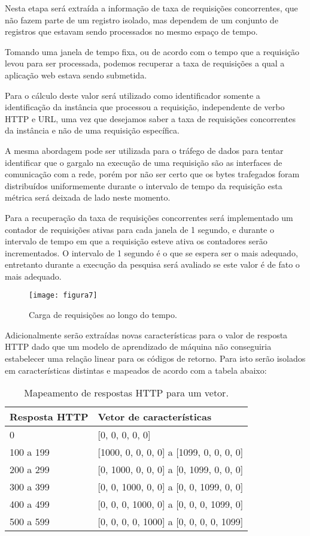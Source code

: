Nesta etapa será extraída a informação de taxa de requisições concorrentes,
que não fazem parte de um registro isolado, mas dependem de um conjunto de
registros que estavam sendo processados no mesmo espaço de tempo.

Tomando uma janela de tempo fixa, ou de acordo com o tempo que a requisição
levou para ser processada, podemos recuperar a taxa de requisições a qual a
aplicação web estava sendo submetida.

Para o cálculo deste valor será utilizado como identificador somente a
identificação da instância que processou a requisição, independente de verbo
HTTP e URL, uma vez que desejamos saber a taxa de requisições concorrentes da
instância e não de uma requisição específica.

A mesma abordagem pode ser utilizada para o tráfego de dados para tentar
identificar que o gargalo na execução de uma requisição são as interfaces de
comunicação com a rede, porém por não ser certo que os bytes trafegados foram
distribuídos uniformemente durante o intervalo de tempo da requisição esta
métrica será deixada de lado neste momento.
 
Para a recuperação da taxa de requisições concorrentes será implementado um
contador de requisições ativas para cada janela de 1 segundo, e durante o
intervalo de tempo em que a requisição esteve ativa os contadores serão
incrementados. O intervalo de 1 segundo é o que se espera ser o mais adequado,
entretanto durante a execução da pesquisa será avaliado se este valor é de
fato o mais adequado.

\begin{figure}
  \centering
  \texttt{[image: figura7]}
  \caption{Carga de requisições ao longo do tempo.\label{fig:carga-de-requisicoes-ao-longo-do-tempo}}
\end{figure}

Adicionalmente serão extraídas novas características para o valor de resposta
HTTP dado que um modelo de aprendizado de máquina não conseguiria estabelecer
uma relação linear para os códigos de retorno. Para isto serão isolados em
características distintas e mapeados de acordo com a tabela abaixo:

\begin{table}[H]
\centering
\caption{Mapeamento de respostas HTTP para um vetor.}
\vspace{0.25cm}
\begin{tabular}{ll}
Resposta HTTP & Vetor de características            \\
\hline
0	      &	[0, 0, 0, 0, 0]                         \\
100 a 199 &	[1000, 0, 0, 0, 0] a [1099, 0, 0, 0, 0] \\
200 a 299 &	[0, 1000, 0, 0, 0] a [0, 1099, 0, 0, 0] \\
300 a 399 &	[0, 0, 1000, 0, 0] a [0, 0, 1099, 0, 0] \\
400 a 499 &	[0, 0, 0, 1000, 0] a [0, 0, 0, 1099, 0] \\
500 a 599 & [0, 0, 0, 0, 1000] a [0, 0, 0, 0, 1099]
\end{tabular}
\end{table}

